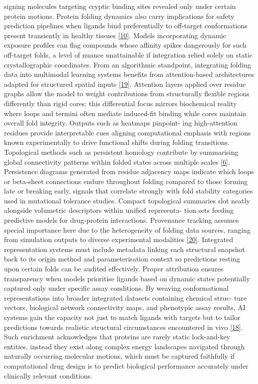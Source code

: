 \documentclass[
]{article}
\begin{document}
signing molecules targeting cryptic binding sites revealed only under
certain protein motions. Protein folding dynamics also carry
implications for safety prediction pipelines when ligands bind
preferentially to off-target conformations present transiently in
healthy tissues {[}\protect\hyperlink{_bookmark50}{10}{]}. Models
incorporating dynamic exposure profiles can flag compounds whose
affinity spikes dangerously for such off-target folds, a level of nuance
unattainable if integration relied solely on static crystallographic
coordinates. From an algorithmic standpoint, integrating folding data
into multimodal learning systems benefits from attention-based
architectures adapted for structured spatial inputs
{[}\protect\hyperlink{_bookmark59}{19}{]}. Attention layers applied over
residue graphs allow the model to weight contributions from structurally
flexible regions differently than rigid cores; this differential focus
mirrors biochemical reality where loops and termini often mediate
induced-fit binding while cores maintain overall fold integrity. Outputs
such as heatmaps pinpoint- ing high-attention residues provide
interpretable cues aligning computational emphasis with regions known
experimentally to drive functional shifts during folding transitions.
Topological methods such as persistent homology contribute by
summarising global connectivity patterns within folded states across
multiple scales {[}\protect\hyperlink{_bookmark46}{6}{]}. Persistence
diagrams generated from residue adjacency maps indicate which loops or
beta-sheet connections endure throughout folding compared to those
forming late or breaking early, signals that correlate strongly with
fold stability categories used in mutational tolerance studies. Compact
topological summaries slot neatly alongside volumetric descriptors
within unified representa- tion sets feeding predictive models for
drug-protein interactions. Provenance tracking assumes special
importance here due to the heterogeneity of folding data sources,
ranging from simulation outputs to diverse experimental modalities
{[}\protect\hyperlink{_bookmark60}{20}{]}. Integrated representation
systems must include metadata linking each structural snapshot back to
its origin method and parameterisation context so predictions resting
upon certain folds can be audited effectively. Proper attribution
ensures transparency when models prioritise ligands based on dynamic
states potentially captured only under specific assay conditions. By
weaving conformational representations into broader integrated datasets
containing chemical struc- ture vectors, biological network connectivity
maps, and phenotypic assay results, AI systems gain the capacity not
just to match ligands with targets but to tailor predictions towards
realistic structural circumstances encountered in vivo
{[}\protect\hyperlink{_bookmark58}{18}{]}. Such enrichment acknowledges
that proteins are rarely static lock-and-key entities, instead they
exist along complex energy landscapes navigated through naturally
occurring molecular motions, which must be captured faithfully if
computational drug design is to predict biological performance
accurately under clinically relevant conditions.
\end{document}
